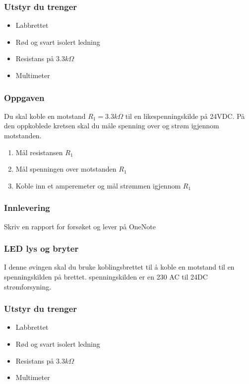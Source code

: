 \documentclass[12pt,a4paper]{article}
\begin{document}
\subsubsection*{Utstyr du trenger}
\begin{itemize}
\item Labbrettet
\item Rød og svart isolert ledning
\item Resistans på $3.3k\Omega$ 
\item Multimeter
\end{itemize}

\subsubsection*{Oppgaven}

Du skal koble en motstand $R_{1}=3.3k\Omega$ til en likespenningskilde
på 24VDC. På den oppkoblede kretsen skal du måle spenning over og strøm igjennom motstanden. 

\begin{enumerate}
\item Mål resistansen $R_{1}$
\item Mål spenningen over motstanden $R_{1}$
\item Koble inn et amperemeter og mål strømmen igjennom $R_{1}$ 
\end{enumerate}

\subsubsection*{Innlevering}

Skriv en rapport for forsøket og lever på OneNote


\newpage
\subsubsection{LED lys og bryter}
I denne øvingen skal du bruke koblingsbrettet til å koble en motstand
til en spenningskilden på brettet. spenningskilden er en 230 AC til 24DC strømforsyning.   

\subsubsection*{Utstyr du trenger}
\begin{itemize}
\item Labbrettet
\item Rød og svart isolert ledning
\item Resistans på $3.3k\Omega$ 
\item Multimeter
\end{itemize}
\end{document}

